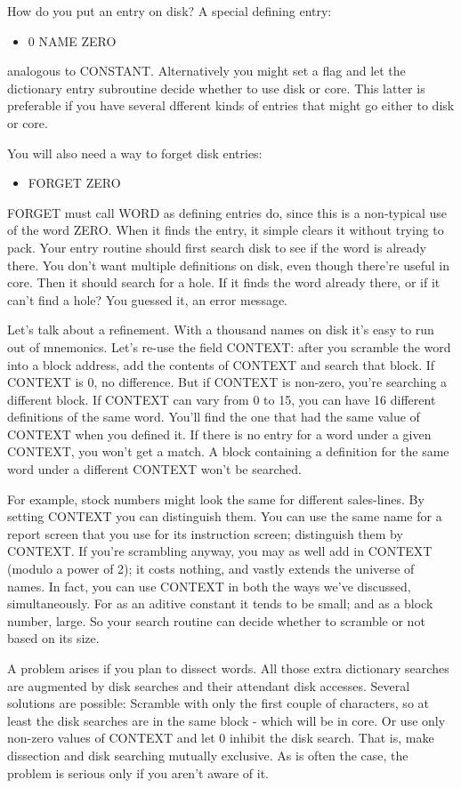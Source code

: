 \documentclass[b5paper, oneside]{book}
\begin{document}
How do you put an entry on disk? A special defining entry:\begin{itemize}
   \item 0 NAME ZERO\end{itemize}
analogous to CONSTANT. Alternatively you might set a flag and let the dictionary entry subroutine decide whether to use disk or core. This latter is preferable if you have several dfferent kinds of entries that might go either to disk or core.

You will also need a way to forget disk entries:\begin{itemize}
   \item FORGET ZERO
\end{itemize}
FORGET must call WORD as defining entries do, since this is a non-typical use of the word ZERO. When it finds the entry, it simple clears it without trying to pack. Your entry routine should first search disk to see if the word is already there. You don't want multiple definitions on disk, even though there're useful in core. Then it should search for a hole. If it finds the word already there, or if it can't find a hole? You guessed it, an error message.

Let's talk about a refinement. With a thousand names on disk it's easy to run out of mnemonics. Let's re-use the field CONTEXT: after you scramble the word into a block address, add the contents of CONTEXT and search that block. If CONTEXT is 0, no difference. But if CONTEXT is non-zero, you're searching a different block. If CONTEXT can vary from 0 to 15, you can have 16 different definitions of the same word. You'll find the one that had the same value of CONTEXT when you defined it. If there is no entry for a word under a given CONTEXT, you won't get a match. A block containing a definition for the same word under a different CONTEXT won't be searched.

For example, stock numbers might look the same for different sales-lines. By setting CONTEXT you can distinguish them. You can use the same name for a report screen that you use for its instruction screen; distinguish them by CONTEXT. If you're scrambling anyway, you may as well add in CONTEXT (modulo a power of 2); it costs nothing, and vastly extends the universe of names. In fact, you can use CONTEXT in both the ways we've discussed, simultaneously. For as an aditive constant it tends to be small; and as a block number, large. So your search routine can decide whether to scramble or not based on its size.

A problem arises if you plan to dissect words. All those extra dictionary searches are augmented by disk searches and their attendant disk accesses. Several solutions are possible: Scramble with only the first couple of characters, so at least the disk searches are in the same block - which will be in core. Or use only non-zero values of CONTEXT and let 0 inhibit the disk search. That is, make dissection and disk searching mutually exclusive. As is often the case, the problem is serious only if you aren't aware of it.
\end{document}
